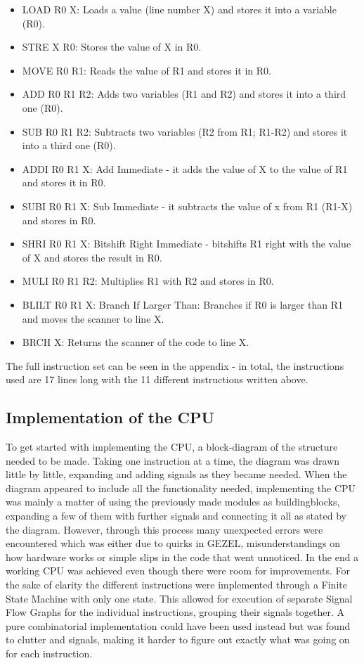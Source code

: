 \documentclass[12pt,a4paper]{article}
\begin{document}
	\begin{itemize}
			
			\item LOAD R0 X: Loads a value (line number X) and stores it into a variable (R0).
			\item STRE X R0: Stores the value of X in R0.
			\item MOVE R0 R1: Reads the value of R1 and stores it in R0.
			\item ADD R0 R1 R2: Adds two variables (R1 and R2) and stores it into a third one (R0).
			\item SUB R0 R1 R2: Subtracts two variables (R2 from R1; R1-R2) and stores it into a third one (R0).
			
			\item ADDI R0 R1 X: Add Immediate - it adds the value of X to the value of R1 and stores it in R0.
			\item SUBI R0 R1 X: Sub Immediate - it subtracts the value of x from R1 (R1-X) and stores in R0.
			\item SHRI R0 R1 X: Bitshift Right Immediate - bitshifts R1 right with the value of X and stores the result in R0.
			\item MULI R0 R1 R2: Multiplies R1 with R2 and stores in R0.
			\item BLILT R0 R1 X: Branch If Larger Than: Branches if R0 is larger than R1 and moves the scanner to line X.
			\item BRCH X: Returns the scanner of the code to line X.
		\end{itemize}
	The full instruction set can be seen in the appendix - in total, the instructions used are 17 lines long with the 11 different instructions written above.
\subsection{Implementation of the CPU}
	To get started with implementing the CPU, a block-diagram of the structure needed to be made. Taking one instruction at a time, the diagram was drawn little by little, expanding and adding signals as they became needed. When the diagram appeared to include all the functionality needed, implementing the CPU was mainly a matter of using the previously made modules as buildingblocks, expanding a few of them with further signals and connecting it all as stated by the diagram. However, through this process many unexpected errors were encountered which was either due to quirks in GEZEL, misunderstandings on how hardware works or simple slips in the code that went unnoticed. In the end a working CPU was achieved even though there were room for improvements.
	For the sake of clarity the different instructions were implemented through a Finite State Machine with only one state. This allowed for execution of separate Signal Flow Graphs for the individual instructions, grouping their signals together. A pure combinatorial implementation could have been used instead but was found to clutter and signals, making it harder to figure out exactly what was going on for each instruction.
	
\end{document}
